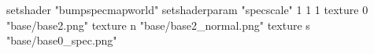 setshader "bumpspecmapworld"
setshaderparam "specscale" 1 1 1
    texture 0 "base/base2.png"
    texture n "base/base2_normal.png"
    texture s "base/base0_spec.png"